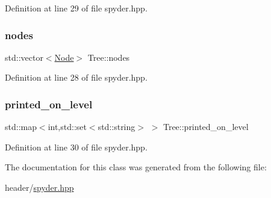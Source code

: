 Definition at line 29 of file spyder.\+hpp.

\mbox{\label{class_tree_aa48810b7e06dd70e4ed128ca4a42325f}} 
\subsubsection{\texorpdfstring{nodes}{nodes}}
{\footnotesize\ttfamily std\+::vector$<$\hyperlink{class_node}{Node}$>$ Tree\+::nodes}



Definition at line 28 of file spyder.\+hpp.

\mbox{\label{class_tree_a31853ff24c8b15101fd1313582aacb9d}} 
\subsubsection{\texorpdfstring{printed\+\_\+on\+\_\+level}{printed\_on\_level}}
{\footnotesize\ttfamily std\+::map$<$int,std\+::set$<$std\+::string$>$ $>$ Tree\+::printed\+\_\+on\+\_\+level}



Definition at line 30 of file spyder.\+hpp.



The documentation for this class was generated from the following file\+:\begin{DoxyCompactItemize}
\item 
header/\hyperlink{spyder_8hpp}{spyder.\+hpp}\end{DoxyCompactItemize}
